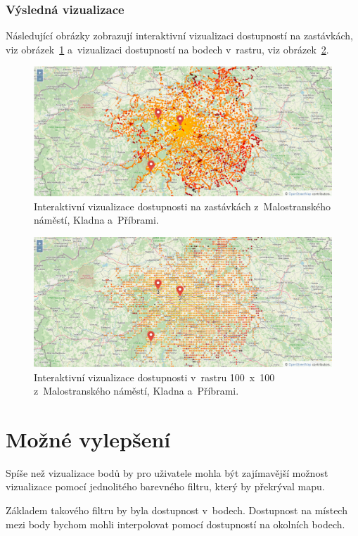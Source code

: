 \subsubsection{Výsledná vizualizace}

Následující obrázky zobrazují interaktivní vizualizaci dostupností na zastávkách, viz obrázek~\ref{fig:ol-vizualizace-zastavek} a~vizualizaci dostupností na bodech v~rastru, viz obrázek~\ref{fig:ol-vizualizace-mist}.

\begin{figure}[ht]
    \centering
    \includegraphics[width=\textwidth]{../img/interactiveStopVisualization.png}
    \caption{Interaktivní vizualizace dostupnosti na zastávkách z~Malostranského náměstí, Kladna a~Příbrami.}
    \label{fig:ol-vizualizace-zastavek}
\end{figure}

\begin{figure}[ht]
    \centering
    \includegraphics[width=\textwidth]{../img/interactivePlaceVisualization.png}
    \caption{Interaktivní vizualizace dostupnosti v~rastru 100~x~100 z~Malostranského náměstí, Kladna a~Příbrami.}
    \label{fig:ol-vizualizace-mist}
\end{figure}

\section{Možné vylepšení}

Spíše než vizualizace bodů by pro uživatele mohla být zajímavější možnost vizualizace pomocí jednolitého barevného filtru, který by překrýval mapu.

Základem takového filtru by byla dostupnost v~bodech. Dostupnost na místech mezi body bychom mohli interpolovat pomocí dostupností na okolních bodech.

